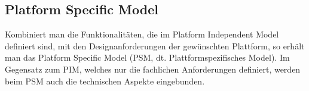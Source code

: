 \subsection{Platform Specific Model} \label{PSM}
Kombiniert man die Funktionalitäten, die im Platform Independent Model definiert
sind, mit den Designanforderungen der gewünschten Plattform, so erhält man das
Platform Specific Model (PSM, dt. Plattformspezifisches Model). Im Gegensatz zum
PIM, welches nur die fachlichen Anforderungen definiert, werden beim PSM auch
die technischen Aspekte eingebunden.